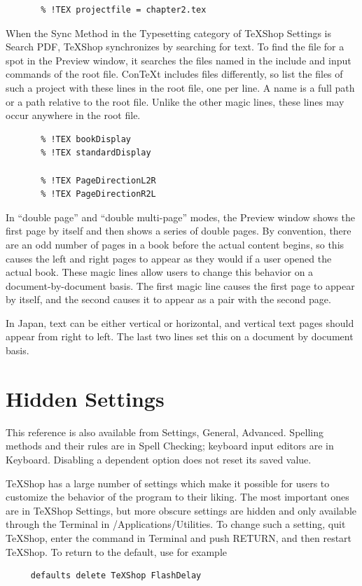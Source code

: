 \documentclass[11pt, oneside]{article}   	%
\begin{document}
\begin{verbatim}
       % !TEX projectfile = chapter2.tex
\end{verbatim}

When the Sync Method in the Typesetting category of TeXShop Settings is Search PDF, TeXShop synchronizes by searching for text. To find the file for a spot in the Preview window, it searches the files named in the include and input commands of the root file. ConTeXt includes files differently, so list the files of such a project with these lines in the root file, one per line. A name is a full path or a path relative to the root file. Unlike the other magic lines, these lines may occur anywhere in the root file.

\newpage
\begin{verbatim}
       % !TEX bookDisplay
       % !TEX standardDisplay
       
       % !TEX PageDirectionL2R
       % !TEX PageDirectionR2L
\end{verbatim}

In ``double page'' and ``double multi-page'' modes, the Preview window shows the first page by itself and then shows a series of double pages. By convention, there are an odd number of pages in a book before the actual content begins, so this causes the left and right pages to appear as they would if a user opened the actual book.  These magic lines allow users to change this behavior on a document-by-document basis. The first magic line causes the first page to appear by itself, and the second causes it to appear as a pair with the second page.

 In Japan, text can be either vertical or horizontal, and vertical text pages should appear from right to left.  The last two lines set this on a document by document basis.


 
\section{Hidden Settings}
This reference is also available from Settings, General, Advanced. Spelling methods and their rules are in Spell Checking; keyboard input editors are in Keyboard. Disabling a dependent option does not reset its saved value.

TeXShop has a large number of settings which make it possible for users to customize the behavior of the program to their liking. The most important ones are in TeXShop Settings, but more obscure settings are hidden and only available through the Terminal in /Applications/Utilities. To change such a setting, quit TeXShop, enter the command in Terminal and push RETURN, and then restart TeXShop. To return to the default, use for example
\begin{verbatim}
     defaults delete TeXShop FlashDelay
\end{verbatim}
\end{document}
